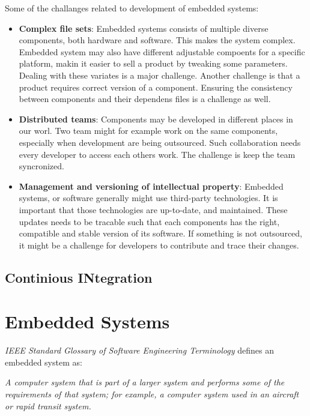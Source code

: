 Some of the challanges related to development of embedded systems\cite{Estublier:2000:SCM:336512.336576}:
\begin{itemize}
	\item \textbf{Complex file sets}: Embedded systems consists of multiple diverse components, both hardware and software. This makes the system complex. Embedded system may also have different adjustable compoents for a specific platform, makin it easier to sell a product by tweaking some parameters. Dealing with these variates is a major challenge. Another challenge is that a product requires correct version of a component. Ensuring the consistency between components and their dependens files is a challenge as well.
	\item \textbf{Distributed teams}: Components may be developed in different places in our worl. Two team might for example work on the same components, especially when development are being outsourced. Such collaboration needs every developer to access each others work. The challenge is keep the team syncronized. 
	\item \textbf{Management and versioning of intellectual property}: Embedded systems, or software generally might use third-party technologies. It is important that those technologies are up-to-date, and maintained. These updates needs to be tracable such that each components has the right, compatible and stable version of its software. If something is not outsourced, it might be a challenge for developers to contribute and trace their changes.
\end{itemize}

\subsection{Continious INtegration}




			

\section{Embedded Systems}

\textit{IEEE Standard Glossary of Software Engineering Terminology}\cite{radatz1990ieee} defines an embedded system as:
\begin{displayquote}
	\textit{A computer system that is part of a larger system and performs some of the requirements of that system; for example, a computer system used in an aircraft or rapid transit system.}
\end{displayquote}


